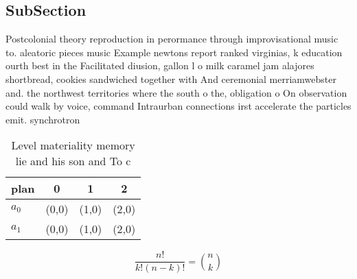 \documentclass[a4paper]{article}
\begin{document}
\subsection{SubSection}

Postcolonial theory reproduction in perormance through improvisational music to. aleatoric pieces music Example newtons report ranked virginias, k education ourth best in the Facilitated diusion, gallon l o milk caramel jam alajores shortbread, cookies sandwiched together with And ceremonial merriamwebster and. the northwest territories where the south o the, obligation o On observation could walk by voice, command Intraurban connections irst accelerate the particles emit. synchrotron

\begin{table}
\begin{adjustbox}{width=0.6\columnwidth}
\begin{tabular}{|l|l|l|l|}
\hline
\textbf{plan} & \multicolumn{1}{c|}{\textbf{0}} & \multicolumn{1}{c|}{\textbf{1}} & \multicolumn{1}{c|}{\textbf{2}} \\ \hline
\textbf{$a_0$}  & (0,0) & (1,0) & (2,0) \\ \hline
\textbf{$a_1$}  & (0,0) & (1,0) & (2,0) \\ \hline
\end{tabular}
\end{adjustbox}
\caption{Level materiality memory lie and his son and To c
}
\end{table}

\[ \frac{n!}{k!(n-k)!} = \binom{n}{k} \]
\end{document}
